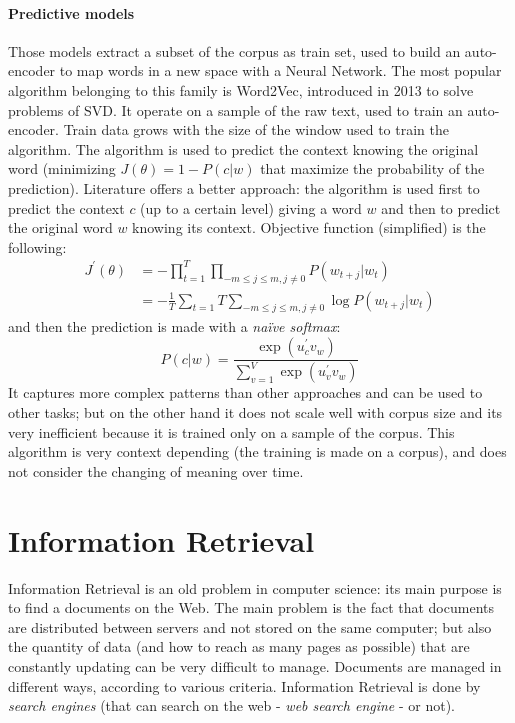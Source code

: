 \documentclass[11pt, a4page]{article}
\begin{document}
\subsection{Predictive models}
Those models extract a subset of the corpus as train set, used to build an auto-encoder to map words in a new space with a Neural Network.
The most popular algorithm belonging to this family is Word2Vec, introduced in 2013 to solve problems of SVD.
It operate on a sample of the raw text, used to train an auto-encoder.
Train data grows with the size of the window used to train the algorithm.
The algorithm is used to predict the context knowing the original word (minimizing $J(\theta) = 1 - P(c | w)$ that maximize the probability of the prediction).
Literature offers a better approach: the algorithm is used first to predict the context $c$ (up to a certain level) giving a word $w$ and then to predict the original word $w$ knowing its context.
Objective function (simplified) is the following:
\begin{align*}
  J^\prime(\theta) &= - \prod_{t = 1}^T \prod_{-m \le j \le m, j \ne 0} P(w_{t + j} | w_t) \\
                   &= - \frac{1}{T} \sum_{t=1}{T} \sum_{-m \le j \le m, j \ne 0}\log P(w_{t + j} | w_t)
\end{align*}
and then the prediction is made with a \textit{naïve softmax}:
\begin{equation*}
  P(c | w) = \frac{\exp(u_c^\prime v_w)}{\sum_{v = 1}^V \exp(u_v^\prime v_w)}
\end{equation*}
It captures more complex patterns than other approaches and can be used to other tasks; but on the other hand it does not scale well with corpus size and its very inefficient because it is trained only on a sample of the corpus.
This algorithm is very context depending (the training is made on a corpus), and does not consider the changing of meaning over time.
\newpage

\part{Information Retrieval}
Information Retrieval is an old problem in computer science: its main purpose is to find a documents on the Web.
The main problem is the fact that documents are distributed between servers and not stored on the same computer; but also the quantity of data (and how to reach as many pages as possible) that are constantly updating can be very difficult to manage.
Documents are managed in different ways, according to various criteria.
Information Retrieval is done by \textit{search engines} (that can search on the web - \textit{web search engine} - or not).
\end{document}
